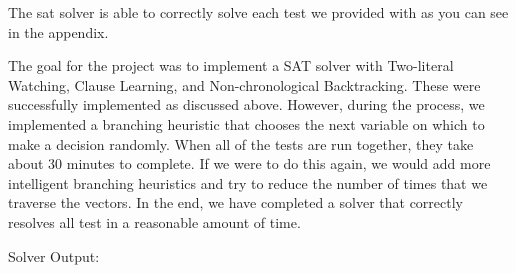\documentclass[9pt]{extarticle}
\begin{document}
\begin{homeworkProblem}
        The sat solver is able to correctly solve each test we provided with as you can see in the appendix.

\end{homeworkProblem}

\begin{homeworkProblem}[Conclusion]
    The goal for the project was to implement a SAT solver with Two-literal Watching, Clause Learning, and Non-chronological Backtracking. These were successfully implemented as discussed above. However, during the process, we implemented a branching heuristic that chooses the next variable on which to make a decision randomly. When all of the tests are run together, they take about 30 minutes to complete. If we were to do this again, we would add more intelligent branching
    heuristics and try to reduce the number of times that we traverse the vectors. In the end, we have completed a solver that correctly resolves all test in a reasonable amount of time.

\end{homeworkProblem}

\clearpage

\begin{homeworkProblem}[Appendix]

Solver Output:

\begin{quote}
    
\end{quote}
    
\end{homeworkProblem}
\end{document}
